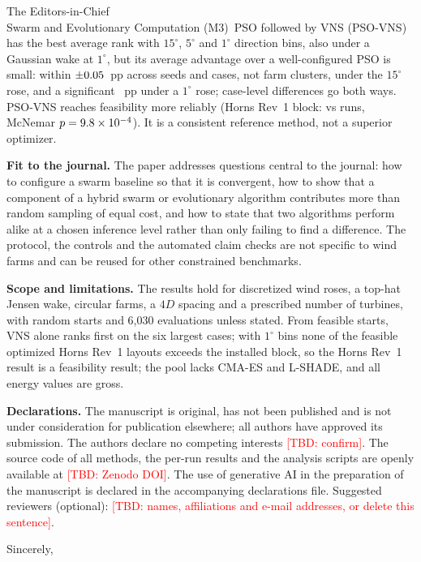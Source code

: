 \documentclass[11pt]{letter}
\newcommand{\TBD}[1]{\textcolor{red}{[TBD: #1]}}
\newcommand{\Journal}{Swarm and Evolutionary Computation}
\newcommand{\JournalEditor}{The Editors-in-Chief}
\begin{document}
\begin{letter}{\JournalEditor\\\Journal}
(M3)~PSO followed by VNS (PSO-VNS) has the best average rank with $15^\circ$, $5^\circ$ and $1^\circ$ direction bins, also under a Gaussian wake at $1^\circ$, but its average advantage over a well-configured PSO is small: within $\pm0.05$~pp across seeds and cases, not farm clusters, under the $15^\circ$ rose, and a significant \NFPairMeanOne~pp under a $1^\circ$ rose; case-level differences go both ways. PSO-VNS reaches feasibility more reliably (Horns Rev~1 block: \NHRFeasPSOVNS{} vs \NHRFeasPSO{} runs, McNemar $p=9.8\times10^{-4}$). It is a consistent reference method, not a superior optimizer.

\textbf{Fit to the journal.} The paper addresses questions central to the journal: how to configure a swarm baseline so that it is convergent, how to show that a component of a hybrid swarm or evolutionary algorithm contributes more than random sampling of equal cost, and how to state that two algorithms perform alike at a chosen inference level rather than only failing to find a difference. The protocol, the controls and the automated claim checks are not specific to wind farms and can be reused for other constrained benchmarks.

\textbf{Scope and limitations.} The results hold for discretized wind roses, a top-hat Jensen wake, circular farms, a $4D$ spacing and a prescribed number of turbines, with random starts and 6,030 evaluations unless stated. From feasible starts, VNS alone ranks first on the six largest cases; with $1^\circ$ bins none of the feasible optimized Horns Rev~1 layouts exceeds the installed block, so the Horns Rev~1 result is a feasibility result; the pool lacks CMA-ES and L-SHADE, and all energy values are gross.

\textbf{Declarations.} The manuscript is original, has not been published and is not under consideration for publication elsewhere; all authors have approved its submission. The authors declare no competing interests \TBD{confirm}. The source code of all methods, the per-run results and the analysis scripts are openly available at \TBD{Zenodo DOI}. The use of generative AI in the preparation of the manuscript is declared in the accompanying declarations file. Suggested reviewers (optional): \TBD{names, affiliations and e-mail addresses, or delete this sentence}.

\closing{Sincerely,}
\end{letter}
\end{document}
